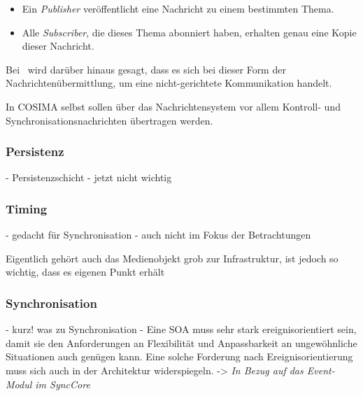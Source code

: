   \begin{itemize}
    \item Ein \emph{Publisher} veröffentlicht eine Nachricht zu einem bestimmten Thema.
    \item Alle \emph{Subscriber}, die dieses Thema abonniert haben, erhalten genau eine Kopie dieser Nachricht.
  \end{itemize}
  
  Bei~\citep[S. 127]{soa_goes_real} wird darüber hinaus gesagt, dass es sich bei dieser Form der Nachrichtenübermittlung, um eine nicht-gerichtete Kommunikation handelt.
  
  In COSIMA selbst sollen über das Nachrichtensystem vor allem Kontroll- und Synchronisationsnachrichten übertragen werden.


\subsubsection{Persistenz} %
\label{ssub:persistenz}

  - Persistenzschicht
  - jetzt nicht wichtig


\subsubsection{Timing} %
\label{ssub:timing}

  - gedacht für Synchronisation
  - auch nicht im Fokus der Betrachtungen


  Eigentlich gehört auch das Medienobjekt grob zur Infrastruktur, ist jedoch so wichtig, dass es eigenen Punkt erhält
  
\subsubsection{Synchronisation} %
\label{ssub:synchronisation}

  - kurz! was zu Synchronisation
  - Eine SOA muss sehr stark ereignisorientiert sein, damit sie den Anforderungen an Flexibilität und Anpassbarkeit an ungewöhnliche Situationen auch genügen kann. Eine solche Forderung nach Ereignisorientierung muss sich auch in der Architektur widerspiegeln. -> \emph{In Bezug auf das Event-Modul im SyncCore}


